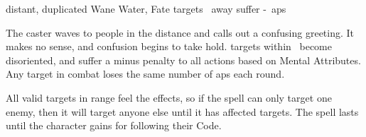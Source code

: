   {distant, duplicated}%
  {Wane}%
  {Water, Fate}%
  {}%
  { targets \spellRange\ away suffer -~\glspl{ap}}%
  {
    The caster waves to people in the distance and calls out a confusing greeting.
    It makes no sense, and confusion begins to take hold.
     targets within \spellRange\ become disoriented, and suffer a minus  penalty to all actions based on Mental Attributes.
    Any target in combat loses the same number of \glspl{ap} each round.

    All valid targets in range feel the effects, so if the spell can only target one enemy, then it will target anyone else until it has affected  targets.
    The spell lasts until the character gains  for following their Code.
  }
